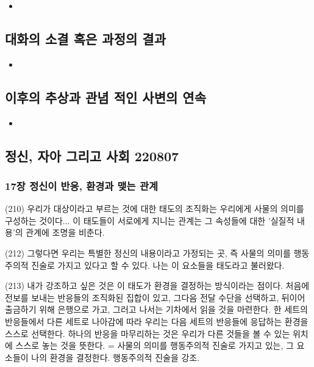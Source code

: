 \documentclass[11pt, a4paper]{article}
\begin{document}
\begin{itemize}
    \item 
\end{itemize}


\subsection{대화의 소결 혹은 과정의 결과}


\begin{itemize}
    \item 
\end{itemize}


\subsection{이후의 추상과 관념 적인 사변의 연속}


\begin{itemize}
    \item 
\end{itemize}






\newpage
\subsection{정신, 자아 그리고 사회 220807}

\subsubsection{17장 정신이 반응, 환경과 맺는 관계}
(210) 우리가 대상이라고 부르는 것에 대한 태도의 조직화는 우리에게 사물의 의미를 구성하는 것이다... 이 태도들이 서로에게 지니는 관계는 그 속성들에 대한 '실질적 내용'의 관계에 조명을 비춘다. 

(212) 그렇다면 우리는 특별한 정신의 내용이라고 가정되는 곳, 즉 사물의 의미를 행동주의적 진술로 가지고 있다고 할 수 있다. 나는 이 요소들을 태도라고 불러왔다. 

(213) 내가 강조하고 싶은 것은 이 태도가 환경을 결정하는 방식이라는 점이다. 처음에 전보를 보내는 반응들의 조직화된 집합이 있고, 그다음 전달 수단을 선택하고, 뒤이어 출금하기 위해 은행으로 가고, 그러고 나서는 기차에서 읽을 것을 마련한다. 한 세트의 반응들에서 다른 세트로 나아감에 따라 우리는 다음 세트의 반응들에 응답하는 환경을 스스로 선택한다. 하나의 반응을 마무리하는 것은 우리가 다른 것들을 볼 수 있는 위치에 스스로 놓는 것을 뜻한다. 
= 사물의 의미를 행동주의적 진술로 가지고 있는, 그 요소들이 나의 환경을 결정한다. 행동주의적 진술을 강조. 
\end{document}
